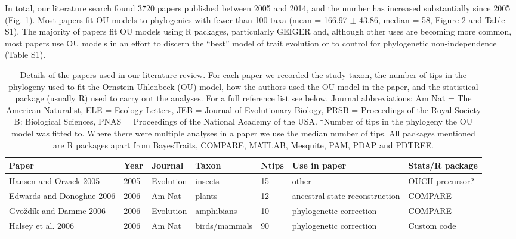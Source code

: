     In total, our literature search found 3720 papers published between 2005 and 2014, and the number has increased substantially since 2005 (Fig. 1). 
    Most papers fit OU models to phylogenies with fewer than 100 taxa (mean = 166.97 $\pm$ 43.86, median = 58, Figure 2 and Table S1). 
    The majority of papers fit OU models using R packages, particularly GEIGER and, although other uses are becoming more common, most papers use OU models in an effort to discern the ``best'' model of trait evolution or to control for phylogenetic non-independence (Table S1). 

\begin{landscape}
\begin{center}

\LTcapwidth=25cm
\begin{longtable}{p{6cm}llllll}
\caption[Literature review]
        {Details of the papers used in our literature review. For each paper we recorded the study taxon, the number of tips in the phylogeny used to fit the Ornstein Uhlenbeck (OU) model, how the authors used the OU model in the paper, and the statistical package (usually R) used to carry out the analyses. For a full reference list see below. Journal abbreviations: Am Nat = The American Naturalist, ELE = Ecology Letters, JEB = Journal of Evolutionary Biology, PRSB = Proceedings of the Royal Society B: Biological Sciences, PNAS = Proceedings of the National Academy of the USA. †Number of tips in the phylogeny the OU model was fitted to. Where there were multiple analyses in a paper we use the median number of tips.  All packages mentioned are R packages apart from BayesTraits, COMPARE, MATLAB, Mesquite, PAM, PDAP and PDTREE.}\\
\bigskip        
\textbf{Paper}  &   \textbf{Year}    &   \textbf{Journal} &   \textbf{Taxon}   &   \textbf{Ntips}   &   \textbf{Use in paper}   &   \textbf{Stats/R package} \\
\hline
Hansen and Orzack 2005    &   2005    &   Evolution   &   insects &   15  &   other   &   OUCH precursor? \\
Edwards and Donoghue 2006     &   2006    &   Am Nat  &   plants  &   12  &   ancestral state reconstruction  &   COMPARE \\
Gvo\v{z}d\'{i}k and Damme 2006    &   2006    &   Evolution   &   amphibians  &   10  &   phylogenetic correction &   COMPARE \\
Halsey et al. 2006    &   2006    &   Am Nat  &   birds/mammals   &   90  &   phylogenetic correction &   Custom code \\

\end{longtable}
\end{center}
\end{landscape}
